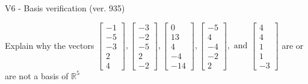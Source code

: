 \begin{exercise}
  \begin{exerciseTitle}V6 - Basis verification (ver. 935)\end{exerciseTitle}
  \begin{exerciseStatement}
    Explain why the vectors \(\left[\begin{array}{r}
-1 \\
-5 \\
-3 \\
2 \\
4
\end{array}\right] , \left[\begin{array}{r}
-3 \\
-2 \\
-5 \\
2 \\
-2
\end{array}\right] , \left[\begin{array}{r}
0 \\
13 \\
4 \\
-4 \\
-14
\end{array}\right] , \left[\begin{array}{r}
-5 \\
4 \\
-4 \\
-2 \\
2
\end{array}\right] , \text{ and } \left[\begin{array}{r}
4 \\
4 \\
1 \\
1 \\
-3
\end{array}\right]\) are or are not a basis of \(\mathbb{R}^5\)	



\end{exerciseStatement}
\end{exercise}
